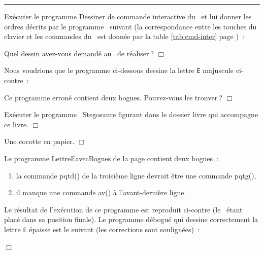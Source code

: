  
\noindent \rule{137mm}{0.1mm} %
\begin{exercice}{
Exécuter le programme {\idt Des\-si\-ner} de commande 
interactive du \robot\ et lui donner les ordres décrits par 
le programme \python\ suivant (la correspondance entre les touches du
clavier et les commandes du \robot\ est donnée par la table
\ref{tab:cmd-inter} page \pageref{tab:cmd-inter})~:

\noindent Quel dessin avez-vous demandé au \robot\ de réaliser$\:$?
\noindent $\Box$}\end{exercice}
\begin{exercice}{
Nous voudrions que le programme ci-dessous dessine la lettre {\tt E} majuscule 
\hbox{ci-contre~:}

{\raggedright 
\vspace{\baselineskip}
\vspace*{3cm}%
\vspace*{-3cm}%
 \label{prog:LettreEavecBogues}
 
 }
\noindent Ce programme erroné contient deux bogues. Pouvez-vous les trouver$\:$?
\noindent $\Box$}\end{exercice}
\begin{exercice}{
Exécuter le programme \python\ {\idt Stegosaure} figurant dans le dossier
{\idt livre} qui accompagne ce livre.
\noindent $\Box$}\end{exercice}
\begin{corrige}{
Une cocotte en papier.
\noindent $\Box$}\end{corrige}
\begin{corrige}{
Le programme {\idt LettreEavecBogues} de la page \pageref{prog:LettreEavecBogues} 
contient deux bogues~:\\
\begin{minipage}[t]{115mm}
\begin{enumerate}
\item la commande {\idt pqtd()} de la troisième ligne
devrait être une commande {\idt pqtg()},
\item il manque une commande {\idt av()} à l'avant-dernière ligne. 
\end{enumerate}
Le résultat de l'exécution de ce programme est reproduit ci-contre
(le \robot\ étant placé dans sa position finale).
Le programme débogué qui dessine correctement la lettre {\tt E} épaisse est le suivant (les corrections sont 
sou\-li\-gnées)~:
\end{minipage}
\hfill
\begin{minipage}[t]{17mm}
\vspace{3.2cm}%
\hspace{-1.7cm}  %
\end{minipage}

\noindent $\Box$}\end{corrige}
